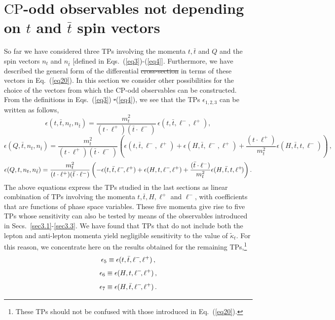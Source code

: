 \documentclass[aps,preprint,tightenlines,floatfix,superscriptaddress,nofootinbib,showpacs]{revtex4-1}
\def\beq{\begin{equation}}
\def\eeq{\end{equation}}
\def\tbar{\bar{t}}
\def\kpt{\tilde{\kappa}_t}
\def\TPa{\epsilon(t,\tbar,n_t,n_{\tbar})}
\def\TPb{\epsilon(Q,\tbar,n_t,n_{\tbar})}
\def\TPc{\epsilon(Q,t,n_t,n_{\tbar})}
\providecommand{\DIFadd}[1]{{\protect\color{blue}\uwave{#1}}} %
\providecommand{\DIFdel}[1]{{\protect\color{red}\sout{#1}}}                      %
\providecommand{\DIFaddbegin}{} %
\providecommand{\DIFaddend}{} %
\providecommand{\DIFdelbegin}{} %
\providecommand{\DIFdelend}{} %
\begin{document}
\section{{\boldmath $\mathrm{CP}$}-odd observables not depending on \MakeLowercase{{\boldmath $t$}} and \MakeLowercase{{\boldmath $\tbar$}} spin vectors}
\label{sec4}
So far we have considered three TPs involving the momenta $t,\tbar$
and $Q$ and the spin vectors $n_t$ and $n_{\tbar}$ [defined in
Eqs.~(\ref{eq3})-(\ref{eq4}\DIFaddbegin \DIFadd{)}\DIFaddend ].  Furthermore, we have described the general
form of the differential \DIFdelbegin \DIFdel{cross-section }\DIFdelend \DIFaddbegin \DIFadd{cross section }\DIFaddend in terms of these vectors in
Eq.~(\ref{eq20}). In this section we consider other
possibilities for the choice of the vectors from which the
$\mathrm{CP}$-odd observables can be constructed. From the definitions
in Eqs.~(\ref{eq3}) \DIFdelbegin \DIFdel{-}\DIFdelend \DIFaddbegin \DIFadd{and }\DIFaddend (\ref{eq4}), we see that the TPs
$\epsilon_{1,2,3}$ can be written as follows,
%
\beq
\label{eq29}
\TPa = \frac{m^2_t}{(t\cdot \ell^+)(\tbar\cdot \ell^-)}\,\epsilon(t,\tbar,\ell^-\!,\ell^+),
\eeq
%
\vspace*{1mm}
\beq
\label{eq30}
\TPb = \frac{m^2_t}{(t\cdot \ell^+)(\tbar\cdot \ell^-)}\left(\epsilon(t,\tbar,\ell^-\!,\ell^+)+\epsilon(H,\tbar,\ell^-\!,\ell^+)+\frac{(t\cdot\ell^+)}{m^2_t}\epsilon(H,\tbar,t,\ell^-\!)\right) \,,
\eeq
%
\vspace*{1mm}
\beq
\label{eq31}
\TPc = \frac{m^2_t}{(t\cdot \ell^+)(\tbar\cdot \ell^-)}\left(-\epsilon(t,\tbar,\ell^-\!,\ell^+)+\epsilon(H,t,\ell^-\!,\ell^+)+\frac{(\tbar\cdot\ell^-)}{m^2_t}\epsilon(H,\tbar,t,\ell^+\!)\right).
\vspace*{2mm}
\eeq
%
The above equations express the TPs studied in the last sections as
linear combination of TPs involving the momenta $t,\tbar,H,\ell^+$ and
$\ell^-$, with coefficients that are functions of phase space
variables. These five momenta give rise to five TPs whose sensitivity
can also be tested by means of the observables introduced in
Secs.~\ref{sec3.1}-\ref{sec3.3}.  We have found
that TPs that do not include both the lepton and anti-lepton momenta yield
negligible sensitivity to the value of $\kpt$.  For this reason,
we concentrate here on the
results obtained for the remaining TPs,\footnote{These TPs should not be confused with those introduced in Eq.~(\ref{eq20}).}
%
\beq
\label{eqa5}
\epsilon_5\equiv\epsilon(t,\tbar,\ell^-\!,\ell^+) \,,
\vspace*{1mm}
\eeq
%
\beq
\label{eqa6}
\epsilon_6\equiv\epsilon(H,t,\ell^-\!,\ell^+) \,,
\vspace*{1mm}
\eeq
%
\beq
\label{eqa7}
\epsilon_7\equiv\epsilon(H,\tbar,\ell^-\!,\ell^+) \,.
\vspace*{1mm}
\eeq
%
\end{document}
